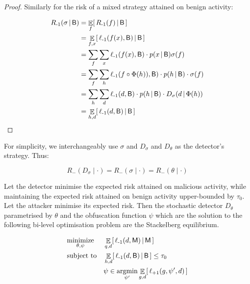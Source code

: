 \begin{proof}
Similarly for the risk of a mixed strategy attained on benign activity:

\begin{align}
    R_{{\text{-}1}}(\sigma \,|\, \mathsf{B}) &= \mathop{\mathbb{E}}_f [\, R_{{\text{-}1}}(f) \,|\, \mathsf{B} \,] \\
    &= \mathop{\mathbb{E}}_{f, x} [\, \ell_{{\text{-}1}}(f(x), \mathsf{B}) \,|\, \mathsf{B} \,] \\
    &= \sum_f \sum_x \ell_{{\text{-}1}}(f(x), \mathsf{B})  \cdot p(x \,|\, \mathsf{B}) \sigma(f) \\
    &= \sum_f \sum_h \ell_{{\text{-}1}}( f \circ \Phi(h) ), \mathsf{B}) \cdot  p(h \,|\, \mathsf{B})  \cdot \sigma(f) \\
    &= \sum_h \sum_d \ell_{{\text{-}1}}(d, \mathsf{B})  \cdot p(h \,|\, \mathsf{B}) \cdot  D_\sigma(d \,|\, \Phi(h)) \\
    &= \mathop{\mathbb{E}}_{h, d} [\, \ell_{{\text{-}1}}(d, \mathsf{B}) \,|\, \mathsf{B} \,]
\end{align}
\end{proof}

\begin{definition}
    For simplicity, we interchangeably use $\sigma$ and $D_\sigma$ and $D_\theta$ as the detector's strategy. Thus:

    \begin{equation}
         R_\minus(D_\sigma \mid \cdot) = R_\minus(\sigma \mid \cdot) = R_\minus(\theta \mid \cdot)
    \end{equation}

\end{definition}


\begin{proposition}
    Let the detector minimise the expected risk attained on malicious activity, while maintaining the expected risk attained on benign activity upper-bounded by $\tau_0$. Let the attacker minimise its expected risk. Then the stochastic detector $D_\theta$ parametrised by $\theta$ and the obfuscation function $\psi$ which are the solution to the following bi-level optimisation problem are the Stackelberg equilibrium.

    \begin{equation}\label{eq:detector_optimisation}
        \begin{aligned}
        & \underset{\theta, \psi} {\text{minimize}}
        & & \mathop{\mathbb{E}}_{q, d} [\, \ell_{{\text{-}1}} (d, \mathsf{M}) \,|\, \mathsf{M} \,] \\
        & \text{subject to}
        & & \mathop{\mathbb{E}}_{h, d} [\, \ell_{{\text{-}1}}(d, \mathsf{B}) \,|\, \mathsf{B} \,] \le \tau_0 \\
        & & & \psi \in \mathop{\text{argmin}}_{\psi'} \mathop{\mathbb{E}}_{g,d} [\, \ell_{{\text{+}1}} (g, \psi', d) \,]
        \end{aligned}
    \end{equation}

\end{proposition}

